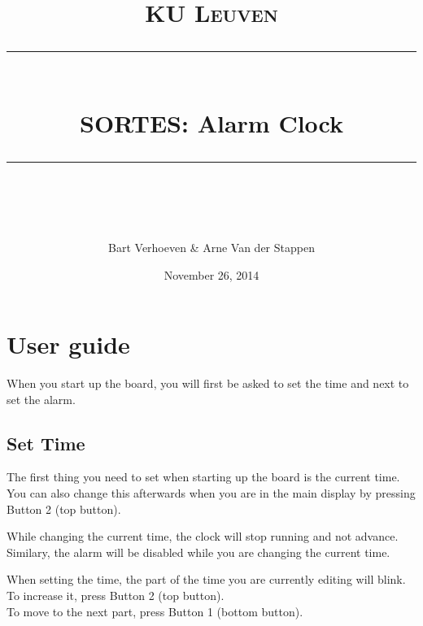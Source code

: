 \documentclass[11pt,a4paper]{scrartcl}
\begin{document}
\lstset{language=Prolog,basicstyle=\footnotesize}
\renewcommand\lstlistingname{Code}
\DeclarePairedDelimiter{\ceil}{\lceil}{\rceil}

\newcommand{\horrule}[1]{\rule{\linewidth}{#1}} %

\title{
\normalfont \normalsize
\textsc{KU Leuven} \\ [25pt] %
\horrule{0.5pt} \\[0.4cm] %
\huge SORTES: Alarm Clock \\ %
\horrule{2pt} \\[0.5cm] %
}
 
\author{Bart Verhoeven \& Arne Van der Stappen} %
 
\date{\normalsize November 26, 2014} %
 
\maketitle %

\tableofcontents

\newpage

\section{User guide \label{sec:userguide}}
When you start up the board, you will first be asked to set the time and next to set the alarm.

\subsection{Set Time}
The first thing you need to set when starting up the board is the current time.\\
You can also change this afterwards when you are in the main display by pressing Button 2 (top button).

While changing the current time, the clock will stop running and not advance.\\
Similary, the alarm will be disabled while you are changing the current time.

When setting the time, the part of the time you are currently editing will blink.\\
To increase it, press Button 2 (top button).\\
To move to the next part, press Button 1 (bottom button).
\end{document}
